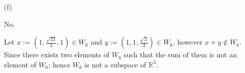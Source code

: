 \begin{Exercise}
\begin{enumerate}[(a)]
\item[(f)]
\begin{answer}
No.
\end{answer}
\begin{solution}
Let $x := (1,\frac{\sqrt{33}}{3},1)\in W_6$ and $y := (1,1,\frac{\sqrt{3}}{3})\in W_6$, however $x+y\notin W_6$.
Since there exists two elements of $W_6$ such that the sum of them is not an element of $W_6$; hence $W_6$ is not a subspace of $\mathbb{R}^3$.
\end{solution}

\end{enumerate}
\end{Exercise}